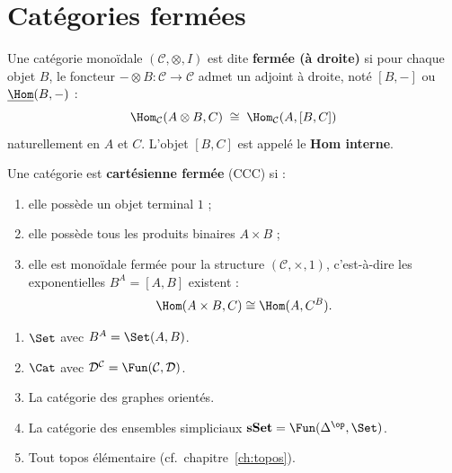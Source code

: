 \section{Catégories fermées}\label{sec:categories-fermees}

\begin{definition}\label{def:monoidale-fermee}
Une catégorie monoïdale $(\mathcal{C}, \otimes, I)$ est dite
\textbf{fermée (à droite)} si pour chaque objet $B$,
le foncteur $- \otimes B \colon \mathcal{C} \to \mathcal{C}$
admet un adjoint à droite, noté $[B, -]$ ou $\underline{\Hom}(B, -)$ :
\[
  \Hom_\mathcal{C}(A \otimes B, C)
  \;\cong\;
  \Hom_\mathcal{C}(A, [B, C])
\]
naturellement en $A$ et $C$.
L'objet $[B, C]$ est appelé le \textbf{Hom interne}.
\end{definition}

\begin{definition}\label{def:cartesienne-fermee}
Une catégorie est \textbf{cartésienne fermée} (CCC) si :
\begin{enumerate}[label=(\roman*)]
\item elle possède un objet terminal $1$ ;
\item elle possède tous les produits binaires $A \times B$ ;
\item elle est monoïdale fermée pour la structure
      $(\mathcal{C}, \times, 1)$, c'est-à-dire les exponentielles
      $B^A = [A, B]$ existent :
      \[
        \Hom(A \times B, C) \cong \Hom(A, C^B).
      \]
\end{enumerate}
\end{definition}

\begin{exemple}\label{ex:ccc}
\begin{enumerate}[label=(\roman*)]
\item $\Set$ avec $B^A = \Set(A, B)$.
\item $\Cat$ avec $\mathcal{D}^\mathcal{C} = \Fun(\mathcal{C}, \mathcal{D})$.
\item La catégorie des graphes orientés.
\item La catégorie des ensembles simpliciaux
      $\mathbf{sSet} = \Fun(\Delta^\op, \Set)$.
\item Tout topos élémentaire (cf.\ chapitre~\ref{ch:topos}).
\end{enumerate}
\end{exemple}

